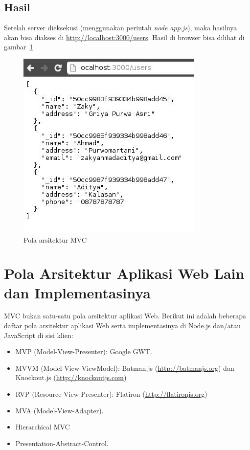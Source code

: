\subsection{Hasil}

Setelah server dieksekusi (menggunakan perintah \textit{node app.js}), maka hasilnya akan bisa diakses di \url{http://localhost:3000/users}. Hasil di browser bisa dilihat di gambar~\ref{fig:hasil-mvc}

  \begin{figure}
    \begin{center}
      \includegraphics[scale=0.5]{images/mvc-result.jpg}
    \end{center}
    \caption{Pola arsitektur MVC}
    \label{fig:hasil-mvc}
  \end{figure}

\section{Pola Arsitektur Aplikasi Web Lain dan Implementasinya}

MVC bukan satu-satu pola arsitektur aplikasi Web. Berikut ini adalah beberapa daftar pola arsitektur aplikasi Web serta implementasinya di Node.js dan/atau JavaScript di sisi klien:
\begin{itemize}
\item MVP (Model-View-Presenter): Google GWT.
\item MVVM (Model-View-ViewModel): Batman.js (\url{http://batmanjs.org}) dan Knockout.js (\url{http://knockoutjs.com})
\item RVP (Resource-View-Presenter): Flatiron (\url{http://flatironjs.org})
\item MVA (Model-View-Adapter).
\item Hierarchical MVC
\item Presentation-Abstract-Control.
\end{itemize}
